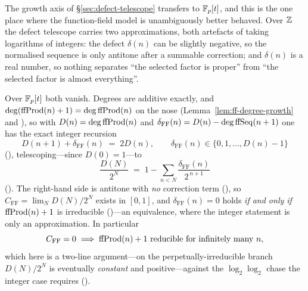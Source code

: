 The growth axis of \S\ref{sec:defect-telescope} transfers to $\mathbb{F}_p[t]$, and
this is the one place where the function-field model is unambiguously
better behaved.  Over $\mathbb{Z}$ the defect telescope carries two
approximations, both artefacts of taking logarithms of integers: the
defect $\delta(n)$ can be slightly negative, so the normalised sequence is
only antitone after a summable correction; and $\delta(n)$ is a real
number, so nothing separates ``the selected factor is proper'' from ``the
selected factor is almost everything''.

Over $\mathbb{F}_p[t]$ both vanish.  Degrees are additive exactly, and
$\deg(\mathrm{ffProd}(n)+1) = \deg\mathrm{ffProd}(n)$ on the nose
(Lemma~\ref{lem:ff-degree-growth} and
), so with
$D(n) = \deg \mathrm{ffProd}(n)$ and
$\delta_{\mathrm{FF}}(n) = D(n) - \deg \mathrm{ffSeq}(n+1)$ one has the exact
integer recursion
\[
  D(n+1) + \delta_{\mathrm{FF}}(n) \;=\; 2D(n),
  \qquad \delta_{\mathrm{FF}}(n) \in \{0,1,\dots,D(n)-1\}
\]
(),
telescoping---since $D(0) = 1$---to
\[
  \frac{D(N)}{2^{N}} \;=\; 1 - \sum_{n<N}\frac{\delta_{\mathrm{FF}}(n)}{2^{\,n+1}}
\]
().
The right-hand side is antitone with \emph{no} correction term
(), so
$C_{\mathrm{FF}} = \lim_N D(N)/2^{N}$ exists in $[0,1]$, and
$\delta_{\mathrm{FF}}(n) = 0$ holds \emph{if and only if} $\mathrm{ffProd}(n)+1$
is irreducible
()---an
equivalence, where the integer statement is only an approximation.  In
particular
\[
  C_{\mathrm{FF}} = 0 \;\Longrightarrow\;
  \mathrm{ffProd}(n)+1 \text{ reducible for infinitely many } n,
\]
which here is a two-line argument---on the perpetually-irreducible branch
$D(N)/2^{N}$ is eventually \emph{constant} and positive---against the
$\log_2\log_2$ chase the integer case requires
().

